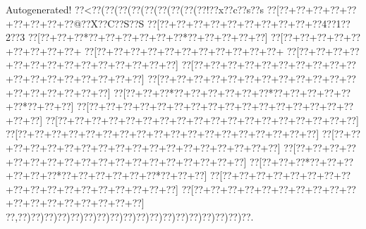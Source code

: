 \documentclass[a5paper]{article}
\begin{document}
Autogenerated!
{\goo
\0??<\0??(\0??(\0??(\0??(\0??(\0??(\0??(\0??(\0??!\0??x\0??c\0??s\0??s
\0??[\0??+\0??+\0??+\0??+\0??+\0??+\0??+\0??+\0??@\0??X\0??C\0??S\0??S
\0??[\0??+\0??+\0??+\0??+\0??+\0??+\0??+\0??+\0??+\0??4\0??1\0??2\0??3
\0??[\0??+\0??+\0??*\0??+\0??+\0??+\0??+\0??+\0??*\0??+\0??+\0??+\0??+\0??]
\0??[\0??+\0??+\0??+\0??+\0??+\0??+\0??+\0??+\0??+
\0??[\0??+\0??+\0??+\0??+\0??+\0??+\0??+\0??+\0??+\0??+\0??+
\0??[\0??+\0??+\0??+\0??+\0??+\0??+\0??+\0??+\0??+\0??+\0??+\0??+\0??+\0??]
\0??[\0??+\0??+\0??+\0??+\0??+\0??+\0??+\0??+\0??+\0??+\0??+\0??+\0??+\0??+\0??+\0??+\0??+\0??]
\0??[\0??+\0??+\0??+\0??+\0??+\0??+\0??+\0??+\0??+\0??+\0??+\0??+\0??+\0??+\0??+\0??+\0??+\0??]
\0??[\0??+\0??+\0??*\0??+\0??+\0??+\0??+\0??+\0??*\0??+\0??+\0??+\0??+\0??+\0??*\0??+\0??+\0??]
\0??[\0??+\0??+\0??+\0??+\0??+\0??+\0??+\0??+\0??+\0??+\0??+\0??+\0??+\0??+\0??+\0??+\0??+\0??]
\0??[\0??+\0??+\0??+\0??+\0??+\0??+\0??+\0??+\0??+\0??+\0??+\0??+\0??+\0??+\0??+\0??+\0??+\0??]
\0??[\0??+\0??+\0??+\0??+\0??+\0??+\0??+\0??+\0??+\0??+\0??+\0??+\0??+\0??+\0??+\0??+\0??+\0??]
\0??[\0??+\0??+\0??+\0??+\0??+\0??+\0??+\0??+\0??+\0??+\0??+\0??+\0??+\0??+\0??+\0??+\0??+\0??]
\0??[\0??+\0??+\0??+\0??+\0??+\0??+\0??+\0??+\0??+\0??+\0??+\0??+\0??+\0??+\0??+\0??+\0??+\0??]
\0??[\0??+\0??+\0??*\0??+\0??+\0??+\0??+\0??+\0??*\0??+\0??+\0??+\0??+\0??+\0??*\0??+\0??+\0??]
\0??[\0??+\0??+\0??+\0??+\0??+\0??+\0??+\0??+\0??+\0??+\0??+\0??+\0??+\0??+\0??+\0??+\0??+\0??]
\0??[\0??+\0??+\0??+\0??+\0??+\0??+\0??+\0??+\0??+\0??+\0??+\0??+\0??+\0??+\0??+\0??+\0??+\0??]
\0??,\0??)\0??)\0??)\0??)\0??)\0??)\0??)\0??)\0??)\0??)\0??)\0??)\0??)\0??)\0??)\0??)\0??)\0??.
}

\newpage
\end{document}
